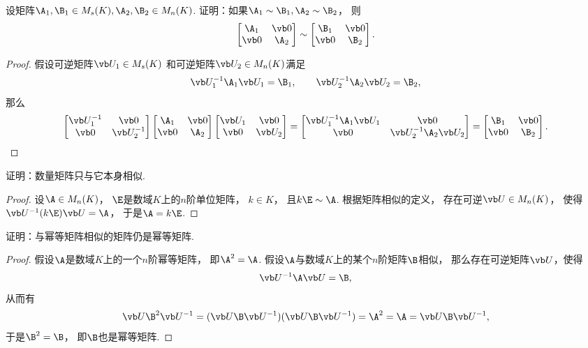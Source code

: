 \begin{example}
设矩阵\(\A_1,\B_1 \in M_s(K),
\A_2,\B_2 \in M_n(K)\).
证明：如果\(\A_1 \sim \B_1,\A_2 \sim \B_2\)，
则\[
	\begin{bmatrix}
		\A_1 & \vb0 \\
		\vb0 & \A_2
	\end{bmatrix}
	\sim \begin{bmatrix}
		\B_1 & \vb0 \\
		\vb0 & \B_2
	\end{bmatrix}.
\]
\begin{proof}
假设可逆矩阵\(\P_1 \in M_s(K)\)
和可逆矩阵\(\P_2 \in M_n(K)\)满足\[
	\P_1^{-1} \A_1 \P_1 = \B_1,
	\qquad
	\P_2^{-1} \A_2 \P_2 = \B_2,
\]
那么\[
	\begin{bmatrix}
		\P_1^{-1} & \vb0 \\
		\vb0 & \P_2^{-1}
	\end{bmatrix}
	\begin{bmatrix}
		\A_1 & \vb0 \\
		\vb0 & \A_2
	\end{bmatrix}
	\begin{bmatrix}
		\P_1 & \vb0 \\
		\vb0 & \P_2
	\end{bmatrix}
	= \begin{bmatrix}
		\P_1^{-1} \A_1 \P_1 & \vb0 \\
		\vb0 & \P_2^{-1} \A_2 \P_2
	\end{bmatrix}
	= \begin{bmatrix}
		\B_1 & \vb0 \\
		\vb0 & \B_2
	\end{bmatrix}.
	\qedhere
\]
\end{proof}
\end{example}
\begin{example}
证明：数量矩阵只与它本身相似.
\begin{proof}
设\(\A \in M_n(K)\)，
\(\E\)是数域\(K\)上的\(n\)阶单位矩阵，
\(k \in K\)，
且\(k\E \sim \A\).
根据矩阵相似的定义，
存在可逆\(\P \in M_n(K)\)，
使得\(\P^{-1} (k\E) \P = \A\)，
于是\(\A = k\E\).
\end{proof}
\end{example}
\begin{example}\label{example:幂等矩阵.幂等矩阵的相似类}
证明：与幂等矩阵相似的矩阵仍是幂等矩阵.
\begin{proof}
假设\(\A\)是数域\(K\)上的一个\(n\)阶幂等矩阵，
即\(\A^2=\A\).
假设\(\A\)与数域\(K\)上的某个\(n\)阶矩阵\(\B\)相似，
那么存在可逆矩阵\(\P\)，使得\[
	\P^{-1}\A\P = \B,
\]
从而有\[
	\P\B^2\P^{-1}
	= (\P\B\P^{-1})(\P\B\P^{-1})
	= \A^2
	= \A
	= \P\B\P^{-1},
\]
于是\(\B^2=\B\)，
即\(\B\)也是幂等矩阵.
\end{proof}
\end{example}
